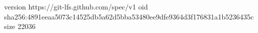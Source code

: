 version https://git-lfs.github.com/spec/v1
oid sha256:4891eeaa5073c14525db5a62d5bba53480ee9dfe9364d3f176831a1b5236435c
size 22036
